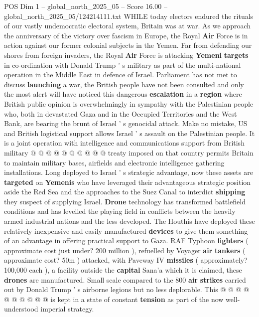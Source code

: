 \begin{textsample}{POS Dim 1 – global\_north\_2025\_05 – Score 16.00 – global\_north\_2025\_05/124214111.txt}  \label{ex:f1_pos_373}
WHILE today electors endured the rituals of our vastly undemocratic electoral system, Britain was at war.
As we approach the anniversary of the victory over fascism in Europe, the Royal \textbf{Air} Force is in action against our former colonial subjects in the Yemen.
Far from defending our shores from foreign invaders, the Royal \textbf{Air} Force is attacking \textbf{Yemeni} \textbf{targets} in co-ordination with Donald Trump ' s military as part of the multi-national operation in the Middle East in defence of Israel.
Parliament has not met to discuss \textbf{launching} a war, the British people have not been consulted and only the most alert will have noticed this dangerous \textbf{escalation} in a \textbf{region} where British public opinion is overwhelmingly in sympathy with the Palestinian people who, both in devastated Gaza and in the Occupied Territories and the West Bank, are bearing the brunt of Israel ' s genocidal attack.
Make no mistake, US and British logistical support allows Israel ' s assault on the Palestinian people.
It is a joint operation with intelligence and communications support from British military @ @ @ @ @ @ @ @ @ @ treaty imposed on that country permits Britain to maintain military bases, airfields and electronic intelligence gathering installations.
Long deployed to Israel ' s strategic advantage, now these assets are \textbf{targeted} on \textbf{Yemenis} who have leveraged their advantageous strategic position aside the Red Sea and the approaches to the Suez Canal to interdict \textbf{shipping} they suspect of supplying Israel. \textbf{Drone} technology has transformed battlefield conditions and has levelled the playing field in conflicts between the heavily armed industrial nations and the less developed.
The Houthis have deployed these relatively inexpensive and easily manufactured \textbf{devices} to give them something of an advantage in offering practical support to Gaza.
RAF Typhoon \textbf{fighters} ( approximate cost just under? 200 million ), refuelled by Voyager \textbf{air} \textbf{tankers} ( approximate cost? 50m ) attacked, with Paveway IV \textbf{missiles} ( approximately? 100,000 each ), a facility outside the \textbf{capital} Sana'a which it is claimed, these \textbf{drones} are manufactured.
Small scale compared to the 800 \textbf{air} \textbf{strikes} carried out by Donald Trump ' s airborne legions but no less deplorable.
This @ @ @ @ @ @ @ @ @ @ is kept in a state of constant \textbf{tension} as part of the now well-understood imperial strategy.

\end{textsample}
